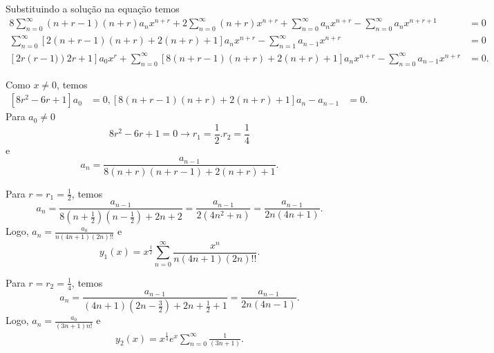 \documentclass[a4paper,12pt, leqno, answers]{exam}
\begin{document}
\begin{questions}
\begin{solution}
        Substituindo a solu\c{c}\~{a}o na equa\c{c}\~{a}o temos
        \begin{align*}
            8 \sum_{n = 0}^\infty \left( n + r - 1 \right) \left( n + r \right) a_n x^{n + r} + 2 \sum_{n = 0}^\infty \left( n + r \right) x^{n + r} + \sum_{n = 0}^\infty a_n x^{n + r} - \sum_{n = 0}^\infty a_n x^{n + r + 1} &= 0 \\
            \sum_{n = 0}^\infty \left[ 2 \left( n + r - 1 \right) \left( n + r \right) + 2 \left( n + r \right) + 1 \right] a_n x^{n + r} - \sum_{n = 1}^\infty a_{n - 1} x^{n + r} &= 0 \\
            \left[ 2 r \left( r - 1) \right) 2 r + 1 \right] a_0 x^r + \sum_{n = 0}^\infty \left[ 8 \left( n + r - 1 \right) \left( n + r \right) + 2 \left( n + r \right) + 1 \right] a_n x^{n + r} - \sum_{n = 0}^\infty a_{n - 1} x^{n + r} &= 0.
        \end{align*}

        Como $x \neq 0$, temos
        \begin{align*}
            \left[ 8 r^2 - 6 r + 1 \right] a_0 &= 0,
            \left[ 8 \left( n + r - 1 \right) \left( n + r \right) + 2 \left( n + r \right) + 1 \right] a_n - a_{n - 1} &= 0.
        \end{align*}
        Para $a_0 \neq 0$
        \[
        8 r^2 - 6 r + 1 = 0 \rightarrow r_1 = \frac{1}{2}. r_2 = \frac{1}{4}
        \]
        e
        \[
        a_n = \frac{a_{n - 1}}{8 \left( n + r \right) \left( n + r - 1 \right) + 2\left( n + r \right) + 1}.
        \]

        Para $r = r_1 = \frac{1}{2}$, temos
        \[
        a_n = \frac{a_{n - 1}}{8 \left( n + \frac{1}{2} \right) \left( n - \frac{1}{2} \right) + 2n + 2} = \frac{a_{n - 1}}{2\left( 4 n^2 + n \right)} = \frac{a_{n - 1}}{2n\left( 4 n + 1 \right)}.
        \]
        Logo, $a_n = \frac{a_0}{n \left( 4n + 1 \right)\left( 2n \right)!!}$ e
        \[
        y_1(x) = x^{\frac{1}{2}} \sum_{n = 0}^\infty \frac{x^n}{n \left( 4n + 1 \right) \left( 2n \right)!!}.
        \]

        Para $r = r_2 = \frac{1}{4}$, temos
        \[
        a_n = \frac{a_{n - 1}}{\left( 4 n + 1 \right) \left( 2n - \frac{3}{2} \right) + 2n + \frac{1}{2} + 1} = \frac{a_{n - 1}}{2n \left( 4n - 1 \right)}.
        \]
        Logo, $a_n = \frac{a_0}{\left( 3 n + 1 \right) n!}$ e
        \begin{align*}
            y_2(x) = x^{\frac{1}{4}} e^x \sum_{n = 0}^\infty \frac{1}{\left( 3n + 1 \right)}.
        \end{align*}
    \end{solution}


\end{questions}
\end{document}
